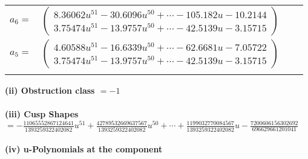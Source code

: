 \documentclass[1p]{elsarticle_modified}
\theoremstyle{definition}
\begin{document}
\begin{tabular}{m{7pt} m{180pt} m{7pt} m{180pt} }
\flushright $a_{6}=$&$\begin{pmatrix}8.36062 u^{51}-30.6096 u^{50}+\cdots-105.182 u-10.2144\\3.75474 u^{51}-13.9757 u^{50}+\cdots-42.5139 u-3.15715\end{pmatrix}$ \\
\flushright $a_{5}=$&$\begin{pmatrix}4.60588 u^{51}-16.6339 u^{50}+\cdots-62.6681 u-7.05722\\3.75474 u^{51}-13.9757 u^{50}+\cdots-42.5139 u-3.15715\end{pmatrix}$\\&\end{tabular}
\flushleft \textbf{(ii) Obstruction class $= -1$}\\~\\
\flushleft \textbf{(iii) Cusp Shapes $= -\frac{11065552867124641}{1393259322402082} u^{51}+\frac{42789532669637567}{1393259322402082} u^{50}+\cdots+\frac{1199032770084567}{1393259322402082} u-\frac{7200606156302692}{696629661201041}$}\\~\\
\newpage\renewcommand{\arraystretch}{1}
\flushleft \textbf{(iv) u-Polynomials at the component}\newline \\
\end{document}
